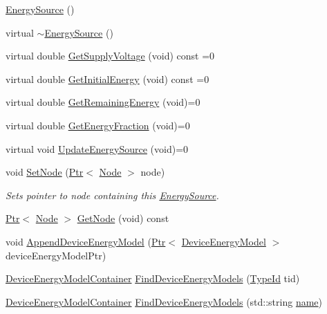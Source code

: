 \begin{DoxyCompactItemize}
\item 
\hyperlink{classns3_1_1EnergySource_a820794a417c3d2f7909f987ba6064cde}{Energy\+Source} ()
\item 
virtual \hyperlink{classns3_1_1EnergySource_a3bbcac784333cd193aeaab94873fe9df}{$\sim$\+Energy\+Source} ()
\item 
virtual double \hyperlink{classns3_1_1EnergySource_a834c547d15a1e5a5295d833c7d542177}{Get\+Supply\+Voltage} (void) const =0
\item 
virtual double \hyperlink{classns3_1_1EnergySource_ae83935d4347fb88be5d823434a555365}{Get\+Initial\+Energy} (void) const =0
\item 
virtual double \hyperlink{classns3_1_1EnergySource_a61bab0597d0ea719643a525515a3f5f1}{Get\+Remaining\+Energy} (void)=0
\item 
virtual double \hyperlink{classns3_1_1EnergySource_acf39f7e41309ae58baf3f179263425c3}{Get\+Energy\+Fraction} (void)=0
\item 
virtual void \hyperlink{classns3_1_1EnergySource_a528aca240cc8d85076982c5042a85e66}{Update\+Energy\+Source} (void)=0
\item 
void \hyperlink{classns3_1_1EnergySource_ae6e7032250a3e851092cd6d0bc3716aa}{Set\+Node} (\hyperlink{classns3_1_1Ptr}{Ptr}$<$ \hyperlink{classns3_1_1Node}{Node} $>$ node)
\begin{DoxyCompactList}\small\item\em Sets pointer to node containing this \hyperlink{classns3_1_1EnergySource}{Energy\+Source}. \end{DoxyCompactList}\item 
\hyperlink{classns3_1_1Ptr}{Ptr}$<$ \hyperlink{classns3_1_1Node}{Node} $>$ \hyperlink{classns3_1_1EnergySource_acac258882d8c38efa49d1f6053eb97ae}{Get\+Node} (void) const 
\item 
void \hyperlink{classns3_1_1EnergySource_a075fe242ae7523cc071752ab1b6b7c02}{Append\+Device\+Energy\+Model} (\hyperlink{classns3_1_1Ptr}{Ptr}$<$ \hyperlink{classns3_1_1DeviceEnergyModel}{Device\+Energy\+Model} $>$ device\+Energy\+Model\+Ptr)
\item 
\hyperlink{classns3_1_1DeviceEnergyModelContainer}{Device\+Energy\+Model\+Container} \hyperlink{classns3_1_1EnergySource_ad2be8bb25ea8bd09dc15f035fda7fd67}{Find\+Device\+Energy\+Models} (\hyperlink{classns3_1_1TypeId}{Type\+Id} tid)
\item 
\hyperlink{classns3_1_1DeviceEnergyModelContainer}{Device\+Energy\+Model\+Container} \hyperlink{classns3_1_1EnergySource_a555cada15ab2bc3c7847b96bc6763773}{Find\+Device\+Energy\+Models} (std\+::string \hyperlink{generate__test__data__lte__spectrum__model_8m_ab74e6bf80237ddc4109968cedc58c151}{name})

\end{DoxyCompactItemize}
